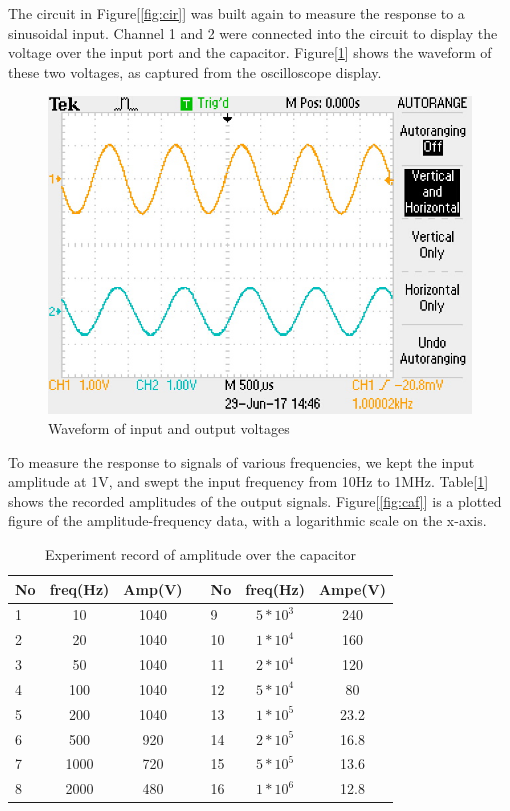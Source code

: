 \hfill\newline
\phantom{ } The circuit in Figure[\ref{fig:cir}] was built again to measure the response to a sinusoidal input. Channel 1 and 2 were connected into the circuit to display the voltage over the input port and the capacitor. Figure[\ref{fig:sinwave}] shows the waveform of these two voltages, as captured from the oscilloscope display. 

\begin{figure}[!htbp]
	\centering
	\begin{framed}
	\includegraphics[width=\linewidth]{images/TEK0011.JPG}
	\caption{Waveform of input and output voltages}
		\end{framed}
	\label{fig:sinwave}
\end{figure}

\phantom{ } To measure the response to signals of various frequencies, we kept the input amplitude at 1V, and swept the input frequency from 10Hz to 1MHz. Table[\ref{tab:caf}] shows the recorded amplitudes of the output signals. Figure[\ref{fig:caf}] is a plotted figure of the amplitude-frequency data, with a logarithmic scale on the x-axis.

\begin{table}[!htbp]
	\centering
	\caption{Experiment record of amplitude over the capacitor}
	\begin{tabular}{lccllcc}
		\toprule
		No&freq(Hz)&Amp(V)&&No&freq(Hz)  &Ampe(V)\\
		\midrule
		1	&10		&1040	&&9 &$5*10^3$&240\\
		2	&20		&1040	&&10&$1*10^4$&160\\
		3	&50		&1040	&&11&$2*10^4$&120\\
		4	&100	&1040	&&12&$5*10^4$&80\\
		5	&200	&1040	&&13&$1*10^5$&23.2\\
		6	&500	&920	&&14&$2*10^5$&16.8\\
		7	&1000	&720	&&15&$5*10^5$&13.6\\
		8	&2000	&480	&&16&$1*10^6$&12.8\\
		\bottomrule
	\end{tabular}
	\label{tab:caf}
\end{table}

